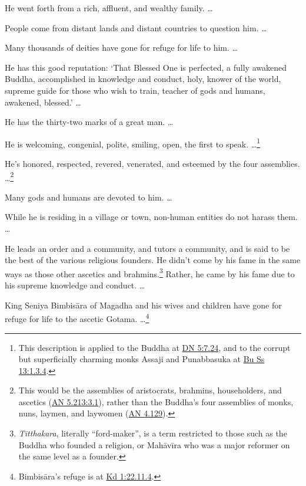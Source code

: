 \documentclass[12pt,openany]{book}%
\begin{document}
He went forth from a rich, affluent, and wealthy family. … 

People come from distant lands and distant countries to question him. … 

Many thousands of deities have gone for refuge for life to him. … 

He has this good reputation: ‘That Blessed One is perfected, a fully awakened Buddha, accomplished in knowledge and conduct, holy, knower of the world, supreme guide for those who wish to train, teacher of gods and humans, awakened, blessed.’ … 

He has the thirty-two marks of a great man. … 

He is welcoming, congenial, polite, smiling, open, the first to speak. …\footnote{This description is applied to the Buddha at \href{https://suttacentral.net/dn5/en/sujato\#7.24}{DN 5:7.24}, and to the corrupt but superficially charming monks Assaji and Punabbasuka at \href{https://suttacentral.net/pli-tv-bu-vb-ss13/en/sujato\#1.3.4}{Bu Ss 13:1.3.4}. } 

He’s honored, respected, revered, venerated, and esteemed by the four assemblies. …\footnote{This would be the assemblies of aristocrats, brahmins, householders, and ascetics (\href{https://suttacentral.net/an5.213/en/sujato\#3.1}{AN 5.213:3.1}), rather than the Buddha’s four assemblies of monks, nuns, laymen, and laywomen (\href{https://suttacentral.net/an4.129/en/sujato}{AN 4.129}). } 

Many gods and humans are devoted to him. … 

While he is residing in a village or town, non-human entities do not harass them. … 

He leads an order and a community, and tutors a community, and is said to be the best of the various religious founders. He didn’t come by his fame in the same ways as those other ascetics and brahmins.\footnote{\textit{Titthakara}, literally “ford-maker”, is a term restricted to those such as the Buddha who founded a religion, or \textsanskrit{Mahāvīra} who was a major reformer on the same level as a founder. } Rather, he came by his fame due to his supreme knowledge and conduct. … 

King Seniya \textsanskrit{Bimbisāra} of Magadha and his wives and children have gone for refuge for life to the ascetic Gotama. …\footnote{\textsanskrit{Bimbisāra}’s refuge is at \href{https://suttacentral.net/pli-tv-kd1/en/sujato\#22.11.4}{Kd 1:22.11.4}. } 
\end{document}
